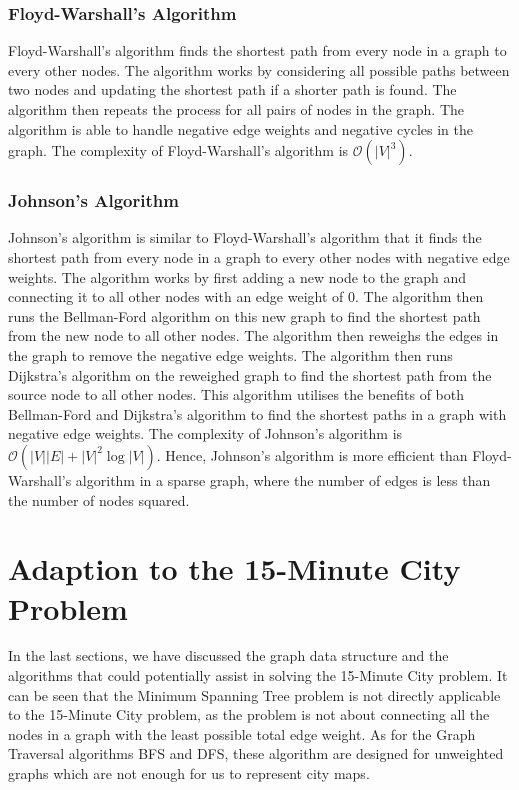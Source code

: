 \subsubsection{Floyd-Warshall's Algorithm}

Floyd-Warshall's algorithm finds the shortest path from every node in a graph to every other nodes. The algorithm works by considering all possible paths between two nodes and updating the shortest path if a shorter path is found. The algorithm then repeats the process for all pairs of nodes in the graph. The algorithm is able to handle negative edge weights and negative cycles in the graph. The complexity of Floyd-Warshall's algorithm is $\mathcal{O}(|V|^3)$.

\subsubsection{Johnson's Algorithm}

Johnson's algorithm is similar to Floyd-Warshall's algorithm that it finds the shortest path from every node in a graph to every other nodes with negative edge weights. The algorithm works by first adding a new node to the graph and connecting it to all other nodes with an edge weight of $0$. The algorithm then runs the Bellman-Ford algorithm on this new graph to find the shortest path from the new node to all other nodes. The algorithm then reweighs the edges in the graph to remove the negative edge weights. The algorithm then runs Dijkstra's algorithm on the reweighed graph to find the shortest path from the source node to all other nodes. This algorithm utilises the benefits of both Bellman-Ford and Dijkstra's algorithm to find the shortest paths in a graph with negative edge weights. The complexity of Johnson's algorithm is $\mathcal{O}(|V||E|+|V|^2\log |V|)$. Hence, Johnson's algorithm is more efficient than Floyd-Warshall's algorithm in a sparse graph, where the number of edges is less than the number of nodes squared.

\section{Adaption to the 15-Minute City Problem}

In the last sections, we have discussed the graph data structure and the algorithms that could potentially assist in solving the 15-Minute City problem. It can be seen that the Minimum Spanning Tree problem is not directly applicable to the 15-Minute City problem, as the problem is not about connecting all the nodes in a graph with the least possible total edge weight. As for the Graph Traversal algorithms BFS and DFS, these algorithm are designed for unweighted graphs which are not enough for us to represent city maps.


